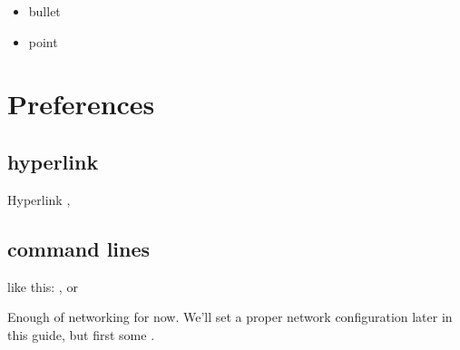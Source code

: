 \documentclass[letterpaper,10pt,english]{sphinxmanual}
\begin{document}
\begin{itemize}
\item {} 
bullet

\item {} 
point

\end{itemize}


\section{Preferences}
\label{\detokenize{afterinstallconfig:preferences}}\label{\detokenize{afterinstallconfig::doc}}

\subsection{hyperlink}
\label{\detokenize{afterinstallconfig:hyperlink}}
Hyperlink ,


\subsection{command lines}
\label{\detokenize{afterinstallconfig:command-lines}}
like this: ,  or

Enough of networking for now. We’ll set a proper network configuration later in this guide, but first some .
\end{document}
